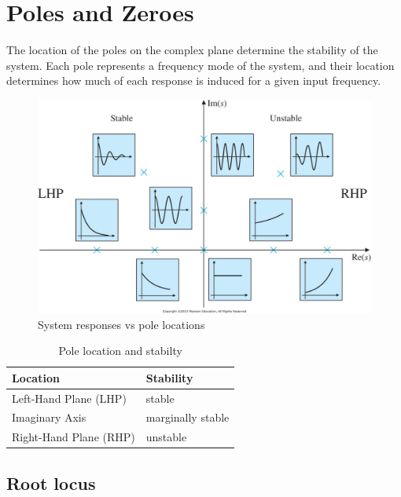 \documentclass[10pt,conference,compsoc]{IEEEtran}
\begin{document}
\section{Poles and Zeroes}

\noindent The location of the poles on the complex plane determine the stability
of the system. Each pole represents a frequency mode of the system, and their
location determines how much of each response is induced for a given input
frequency.

\begin{figure}[H]
  \includegraphics[width=\linewidth]{figs/ResponseVsPoleLocations.png}
  \caption{System responses vs pole locations \cite{bib:pole_locations}}
\end{figure}

\begin{table}[ht]
  \caption{Pole location and stabilty}
  \renewcommand{\arraystretch}{1.3}
  \centering
  \begin{tabularx}{\linewidth}{|lX|}
    \hline
    \textbf{Location} & \textbf{Stability} \\
    \hline
    Left-Hand Plane (LHP) & stable \\
    Imaginary Axis & marginally stable \\
    Right-Hand Plane (RHP) & unstable \\
    \hline
  \end{tabularx}
  \label{tab:pole_locations}
\end{table}

\subsection{Root locus}
\end{document}
